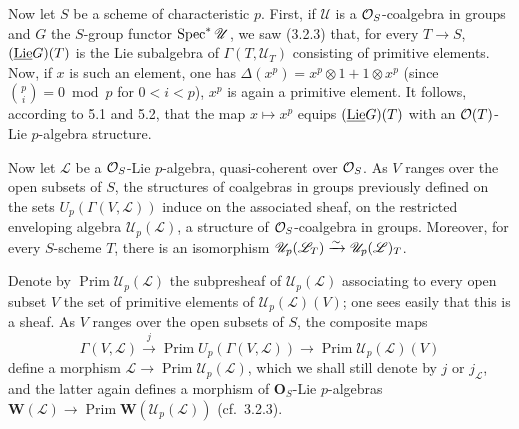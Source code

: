 Now let $S$ be a scheme of characteristic $p$. First, if $\mathscr U$ is a $\mathcal{O}_S$-coalgebra in groups and $G$ the $S$-group functor $\operatorname{Spec}^*\mathscr U$, we saw (3.2.3) that, for every $T\to S$, $(\underline{\operatorname{Lie}} G)(T)$ is the Lie subalgebra of $\Gamma(T,\mathscr U_T)$ consisting of primitive elements. Now, if $x$ is such an element, one has $\Delta(x^p)=x^p\otimes1+1\otimes x^p$ (since $\binom pi=0\bmod p$ for $0<i<p$), \ie $x^p$ is again a primitive element. It follows, according to 5.1 and 5.2, that the map $x\mapsto x^p$ equips $(\underline{\operatorname{Lie}} G)(T)$ with an $\mathcal{O}(T)$-Lie $p$-algebra structure.

Now let $\mathscr L$ be a $\mathcal{O}_S$-Lie $p$-algebra, quasi-coherent over $\mathcal{O}_S$. As $V$ ranges over the open subsets of $S$, the structures of coalgebras in groups previously defined on the sets $U_p(\Gamma(V,\mathscr L))$ induce on the associated sheaf, \ie on the restricted enveloping algebra $\mathscr U_p(\mathscr L)$, a structure of $\mathcal{O}_S$-coalgebra in groups. Moreover, for every $S$-scheme $T$, there is an isomorphism $\mathscr U_p(\mathscr L_T)\xrightarrow{\sim}\mathscr U_p(\mathscr L)_T$.

Denote by $\operatorname{Prim}\mathscr U_p(\mathscr L)$ the subpresheaf of $\mathscr U_p(\mathscr L)$ associating to every open subset $V$ the set of primitive elements of $\mathscr U_p(\mathscr L)(V)$; one sees easily that this is a sheaf. As $V$ ranges over the open subsets of $S$, the composite maps
\[
\Gamma(V,\mathscr L)\xrightarrow{j}\operatorname{Prim}U_p(\Gamma(V,\mathscr L))\longrightarrow\operatorname{Prim}\mathscr U_p(\mathscr L)(V)
\]
define a morphism $\mathscr L\to\operatorname{Prim}\mathscr U_p(\mathscr L)$, which we shall still denote by $j$ or $j_{\mathscr L}$, and the latter again defines a morphism of $\mathbf O_S$-Lie $p$-algebras $\mathbf W(\mathscr L)\to\operatorname{Prim}\mathbf W(\mathscr U_p(\mathscr L))$ (cf.\ 3.2.3).

